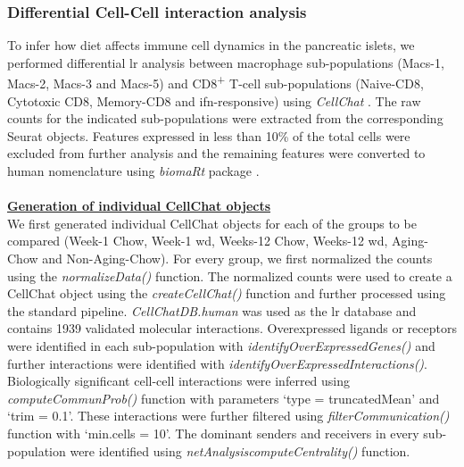 



\subsubsection{\large Differential Cell-Cell interaction analysis}
\label{subsubsec:met_chp2_cellcell}
To infer how diet affects immune cell dynamics in the pancreatic islets, we performed differential \gls{lr} analysis between macrophage sub-populations (Macs-1, Macs-2, Macs-3 and Macs-5) and CD8\textsuperscript{+} T-cell sub-populations (Naive-CD8, Cytotoxic CD8, Memory-CD8 and \gls{ifn}-responsive) using \textit{CellChat} \textbf{\cite{jin_cellchat_2023}}. The raw counts for the indicated sub-populations were extracted from the corresponding Seurat objects. Features expressed in less than 10\% of the total cells were excluded from further analysis and the remaining features were converted to human nomenclature using \textit{biomaRt} package \textbf{\cite{durinck_biomart_2005,durinck_mapping_2009}}.\\\\

\underline{\normalsize \textbf{Generation of individual CellChat objects}}\\

We first generated individual CellChat objects for each of the groups to be compared (Week-1 Chow, Week-1 \gls{wd}, Weeks-12 Chow, Weeks-12 \gls{wd}, Aging-Chow and Non-Aging-Chow). For every group, we first normalized the counts using the \textit{normalizeData()} function. The normalized counts were used to create a CellChat object using the \textit{createCellChat()} function and further processed using the standard pipeline. \textit{CellChatDB.human} was used as the \gls{lr} database and contains 1939 validated molecular interactions. Overexpressed ligands or receptors were identified in each sub-population with \textit{identifyOverExpressedGenes()} and further interactions were identified with \textit{identifyOverExpressedInteractions()}. Biologically significant cell-cell interactions were inferred using \textit{computeCommunProb()} function with parameters `type = truncatedMean' and `trim = 0.1'. These interactions were further filtered using \textit{filterCommunication()} function with `min.cells = 10'. The dominant senders and receivers in every sub-population were identified using \textit{netAnalysis\textunderscore computeCentrality()} function.


